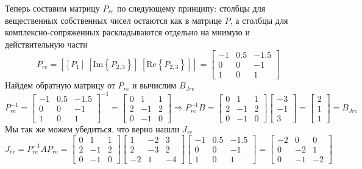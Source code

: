 \documentclass[a4paper, 12pt]{article}
\begin{document}
    Теперь составим матрицу $P_{re}$ по следующему принципу:
    столбцы для вещественных собственных чисел остаются как в матрице $P$,
    а столбцы для комплексно-сопряженных раскладываются отдельно на мнимую и действительную части
    $$P_{re}=\left[\left[P_1\right]\ \left[\text{Im}\left\{P_{2,3}\right\}\right]\ \left[\text{Re}\left\{P_{2,3}\right\}\right]\right]=\begin{bmatrix}
        -1 &0.5 &-1.5\\
        0 &0 &-1\\
        1 &0 &1
    \end{bmatrix}$$
    Найдем обратную матрицу от $P_{re}$ и вычислим $B_{Jre}$
    $$
    P_{re}^{-1}=\begin{bmatrix}
        -1 &0.5 &-1.5\\
        0 &0 &-1\\
        1 &0 &1
    \end{bmatrix}^{-1}=\begin{bmatrix}
        0 &1 &1\\
        2 &-1 &2\\
        0 &-1 &0
    \end{bmatrix}\Rightarrow
    P_{re}^{-1}B=\begin{bmatrix}
        0 &1 &1\\
        2 &-1 &2\\
        0 &-1 &0
    \end{bmatrix}\begin{bmatrix}
        -3\\
        -1\\
        3
    \end{bmatrix}=\begin{bmatrix}
        2\\
        1\\
        1
    \end{bmatrix}=B_{Jre}
    $$
    Мы так же можем убедиться, что верно нашли $J_{re}$
    $$J_{re}=P_{re}^{-1}AP_{re}=\begin{bmatrix}
        0 &1 &1\\
        2 &-1 &2\\
        0 &-1 &0
    \end{bmatrix}\begin{bmatrix}
        1 &-2 &3\\
        2 &-3 &2\\
        -2 &1 &-4
    \end{bmatrix}\begin{bmatrix}
        -1 &0.5 &-1.5\\
        0 &0 &-1\\
        1 &0 &1
    \end{bmatrix}=\begin{bmatrix}
        -2 &0 &0\\
        0 &-2 &1\\
        0 &-1 &-2
    \end{bmatrix}$$
\end{document}
